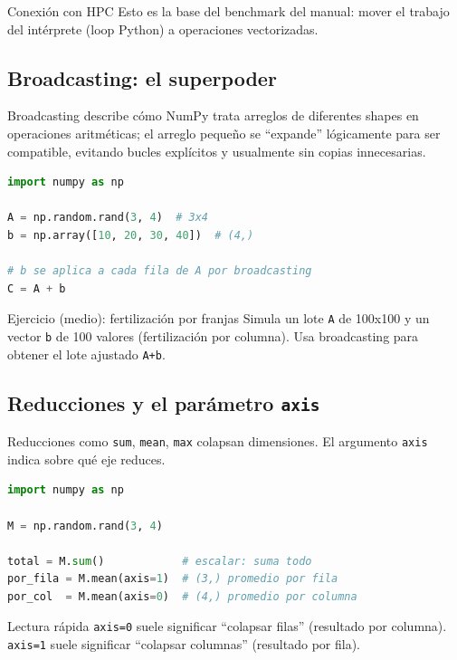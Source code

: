 \documentclass[11pt, a4paper]{article}
\begin{document}
\begin{conceptbox}{Conexión con HPC}
Esto es la base del benchmark del manual: mover el trabajo del intérprete (loop Python) a operaciones vectorizadas.
\end{conceptbox}

\subsection{Broadcasting: el superpoder}
Broadcasting describe cómo NumPy trata arreglos de diferentes shapes en operaciones aritméticas; el arreglo pequeño se ``expande'' lógicamente para ser compatible, evitando bucles explícitos y usualmente sin copias innecesarias.

\begin{lstlisting}[language=Python, caption={Broadcasting: sumar vector a cada fila}]
import numpy as np

A = np.random.rand(3, 4)  # 3x4
b = np.array([10, 20, 30, 40])  # (4,)

# b se aplica a cada fila de A por broadcasting
C = A + b
\end{lstlisting}

\begin{agrobox}{Ejercicio (medio): fertilización por franjas}
Simula un lote \texttt{A} de 100x100 y un vector \texttt{b} de 100 valores
(fertilización por columna). Usa broadcasting para obtener el lote ajustado \texttt{A+b}.
\end{agrobox}

\subsection{Reducciones y el parámetro \texttt{axis}}
Reducciones como \texttt{sum}, \texttt{mean}, \texttt{max} colapsan dimensiones.
El argumento \texttt{axis} indica sobre qué eje reduces.

\begin{lstlisting}[language=Python, caption={Reducciones por eje}]
import numpy as np

M = np.random.rand(3, 4)

total = M.sum()            # escalar: suma todo
por_fila = M.mean(axis=1)  # (3,) promedio por fila
por_col  = M.mean(axis=0)  # (4,) promedio por columna
\end{lstlisting}

\begin{conceptbox}{Lectura rápida}
\texttt{axis=0} suele significar ``colapsar filas'' (resultado por columna).
\texttt{axis=1} suele significar ``colapsar columnas'' (resultado por fila).
\end{conceptbox}
\end{document}
